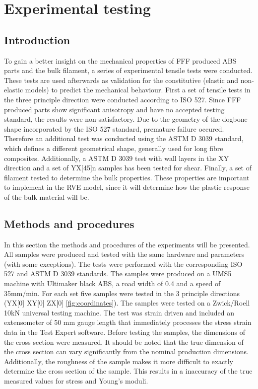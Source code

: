 \chapter{Experimental testing}
\label{chp:5}

\graphicspath{{chapter_5_Experimentaltesting/figures}}

\section{Introduction}
To gain a better insight on the mechanical properties of FFF produced ABS parts and the bulk filament, a series of experimental tensile tests were conducted. These tests are used afterwards as validation for the constitutive (elastic and non-elastic models) to predict the mechanical behaviour. First a set of tensile tests in the three principle direction were conducted according to ISO 527\cite{De2013NEN-EN-ISO527-4}\cite{Afd2016NEN-EN-ISO527-2}. Since FFF produced parts show significant anisotropy and have no accepted testing standard, the results were non-satisfactory. Due to the geometry of the dogbone shape incorporated by the ISO 527 standard, premature failure occured. Therefore an additional test was conducted using the ASTM D 3039 \cite{ASTM2008ASTM3039} standard, which defines a different geometrical shape, generally used for long fibre composites. Additionally, a ASTM D 3039 test with wall layers in the XY direction and a set of YX[45]n samples has been tested for shear. Finally, a set of filament tested to determine the bulk properties. These properties are important to implement in the RVE model, since it will determine how the plastic response of the bulk material will be. 

\section{Methods and procedures}
In this section the methods and procedures of the experiments will be presented. All samples were produced and tested with the same hardware and parameters (with some exceptions). The tests were performed with the corresponding ISO 527 and ASTM D 3039 standards.
The samples were produced on a UMS5 machine with Ultimaker black ABS\cite{Ultimaker2018TechnicalABS}, a road width of 0.4 and a speed of 35mm/min. For each set five samples were tested in the 3 principle directions (YX[0] XY[0] ZX[0] \ref{fig:coordinates}). The samples were tested on a Zwick/Roell 10kN universal testing machine. The test was strain driven and included an extensometer of 50 mm gauge length that immediately processes the stress strain data in the Test Expert software. Before testing the samples, the dimensions of the cross section were measured. It should be noted that the true dimension of the cross section can vary significantly from the nominal production dimensions. Additionally, the roughness of the sample makes it more difficult to exactly determine the cross section of the sample. This results in a inaccuracy of the true measured values for stress and Young's moduli. 

